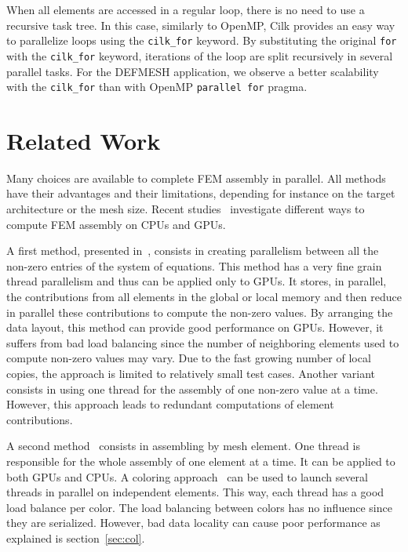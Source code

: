 \documentclass[10pt]{IOS-Book-Article}
\begin{document}
When all elements are accessed in a regular loop, there is no need to use a recursive task tree.
In this case, similarly to OpenMP, Cilk provides an easy way to parallelize loops using the { \tt cilk\_for} keyword.
By substituting the original {\tt for} with the {\tt cilk\_for} keyword, iterations of the loop are split recursively in several parallel tasks.
For the DEFMESH application, we observe a better scalability with the {\tt cilk\_for} than with OpenMP {\tt parallel for} pragma.

\section{Related Work}
Many choices are available to complete FEM assembly in parallel.
All methods have their advantages and their limitations, depending for instance on the target architecture or the mesh size.
Recent studies~\cite{cecka2011assembly,CPUGPUasm} investigate different ways to compute FEM assembly on CPUs and GPUs.

A first method, presented in~\cite{cecka2011assembly}, consists in creating parallelism between all the non-zero entries of the system of equations.
This method has a very fine grain thread parallelism and thus can be applied only to GPUs.
It stores, in parallel, the contributions from all elements in the global or local memory and then reduce in parallel these contributions to compute the non-zero values.
By arranging the data layout, this method can provide good performance on GPUs.
However, it suffers from bad load balancing since the number of neighboring elements used to compute non-zero values may vary.
Due to  the fast growing number of local copies, the approach is limited to relatively small test cases.
Another variant consists in using one thread for the assembly of one non-zero value at a time. However, this approach leads to redundant computations of element contributions.

A second method~\cite{cecka2011assembly} consists in assembling by mesh element. One thread is responsible for the whole assembly of one element at a time.
It can be applied to both GPUs and CPUs.
A coloring approach~\cite{CUDAfe,CPUfe} can be used to launch several threads in parallel on independent elements.
This way, each thread has a good load balance per color. The load balancing between colors has no influence since they are serialized.
However, bad data locality can cause poor performance as explained is section~\ref{sec:col}.
\end{document}
